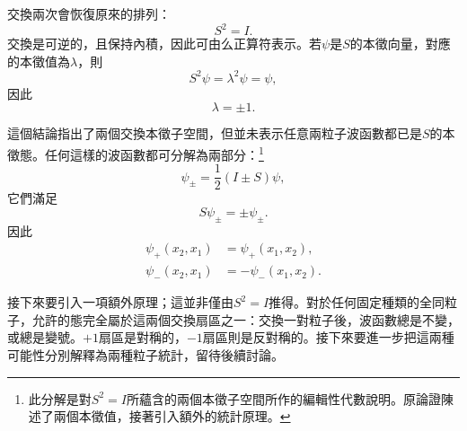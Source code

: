 交換兩次會恢復原來的排列：
\begin{equation}
S^{2}=I.
\end{equation}
交換是可逆的，且保持內積，因此可由么正算符表示。若\(\psi\)是\(S\)的本徵向量，對應的本徵值為\(\lambda\)，則
\[
S^{2}\psi=\lambda^{2}\psi=\psi,
\]
因此
\begin{equation}
\lambda=\pm1.
\end{equation}

這個結論指出了兩個交換本徵子空間，但並未表示任意兩粒子波函數都已是\(S\)的本徵態。任何這樣的波函數都可分解為兩部分：\footnote{此分解是對\(S^{2}=I\)所蘊含的兩個本徵子空間所作的編輯性代數說明。原論證陳述了兩個本徵值，接著引入額外的統計原理。}
\begin{equation}
\psi_{\pm}=\frac12(I\pm S)\psi,
\end{equation}
它們滿足
\begin{equation}
S\psi_{\pm}=\pm\psi_{\pm}.
\end{equation}
因此
\begin{align}
\psi_{+}(x_{2},x_{1})&=\psi_{+}(x_{1},x_{2}),\\
\psi_{-}(x_{2},x_{1})&=-\psi_{-}(x_{1},x_{2}).
\end{align}

接下來要引入一項額外原理；這並非僅由\(S^{2}=I\)推得。對於任何固定種類的全同粒子，允許的態完全屬於這兩個交換扇區之一：交換一對粒子後，波函數總是不變，或總是變號。\(+1\)扇區是對稱的，\(-1\)扇區則是反對稱的。接下來要進一步把這兩種可能性分別解釋為兩種粒子統計，留待後續討論。
